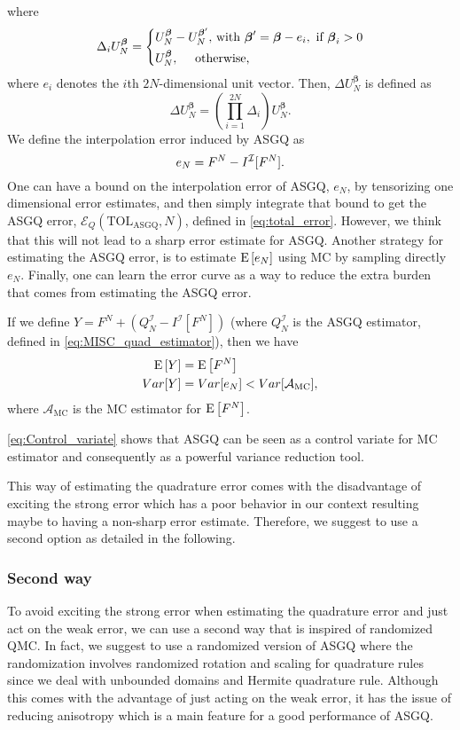 where 
\begin{equation*}
\Delta_i U_N^{\boldsymbol{\beta}} = \left\{ 
\aligned 
 U_N^{\boldsymbol{\beta}} &- U_N^{\boldsymbol{\beta}'}  \text{, with } \boldsymbol{\beta}' =\boldsymbol{\beta} - e_i, \text{ if } \boldsymbol{\beta}_i>0 \\
 U_N^{\boldsymbol{\beta}} &, \quad  \text{ otherwise,}
\endaligned
\right.
\end{equation*}
where $e_i$ denotes the $i$th $2N$-dimensional unit vector. Then, $\Delta
U_N^{\boldsymbol{\beta}}$ is defined as
\begin{equation*}
\Delta U_N^{\boldsymbol{\beta}} = \left( \prod_{i=1}^{2N} \Delta_i \right) U_N^{\boldsymbol{\beta}}.
\end{equation*}
We define the interpolation error induced by ASGQ as
\begin{equation}
e_{N}= F^N-I^{\mathcal{I}}[F^N] .
\end{equation}
One can have a bound on the interpolation error of ASGQ, $e_{N}$, by tensorizing one dimensional error estimates, and  then simply integrate that bound to get the ASGQ  error, $\mathcal{E}_Q(\text{TOL}_{\text{ASGQ}},N)$, defined in \eqref{eq:total_error}. However, we think that this will  not lead to a sharp error estimate for ASGQ. Another strategy for estimating the ASGQ  error, is to estimate $\mathrm{E}\left[e_N\right]$ using MC by sampling directly $e_N$. Finally,  one can learn the error curve as a way to reduce the extra burden that comes from estimating the ASGQ error.

If we define $Y=F^N+(Q_N^{\mathcal{I}}-I^{\mathcal{I}}[F^N])$ (where $Q_N^{\mathcal{I}}$ is the ASGQ  estimator, defined in \eqref{eq:MISC_quad_estimator}), then we have
\begin{align}\label{eq:Control_variate}
\mathrm{E}\left[Y\right]&=\mathrm{E}\left[F^N\right]\nonumber\\
Var[Y]&=Var[e_N]< Var[\mathcal{A}_{\text{MC}}],
\end{align}
where $\mathcal{A}_{\text{MC}}$ is the MC estimator for $\mathrm{E}\left[F^N\right]$.

\eqref{eq:Control_variate} shows that ASGQ can be seen as a control variate for MC estimator and consequently as a powerful variance reduction tool.

This way of estimating the quadrature error comes with the disadvantage of exciting the strong error which has a poor behavior in our context resulting maybe to having a non-sharp error estimate. Therefore, we suggest to use a second option as detailed in the following.
\subsubsection*{Second way}
To avoid exciting the strong error when estimating the quadrature error and just act on the weak error, we can use a second way that is inspired of randomized QMC. In fact, we suggest to use a randomized version of ASGQ where the randomization involves randomized rotation and scaling for quadrature rules since we deal with unbounded domains and Hermite quadrature rule. Although this comes with the advantage of just acting on the weak error, it has the issue of reducing anisotropy which is a main feature for a good performance of ASGQ.